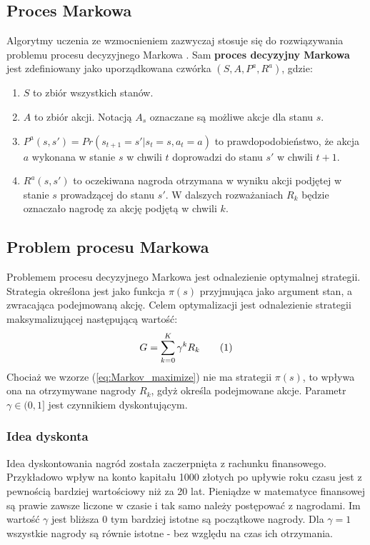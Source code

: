 \documentclass[12pt]{book}
\theoremstyle{plain}
\newcommand\addtag{\refstepcounter{equation}
\renewcommand{\labelenumii}{\theenumii}
\renewcommand{\theenumii}{\theenumi.\arabic{enumii}.}
\tag{\theequation}}
\newcommand{\myref}[1]{(\ref{#1})}
\begin{document}
\subsection*{Proces Markowa}
Algorytmy uczenia ze wzmocnieniem zazwyczaj stosuje się do rozwiązywania problemu procesu decyzyjnego Markowa \cite{reinforcementBook}. Sam \textbf{proces decyzyjny Markowa} jest zdefiniowany jako uporządkowana czwórka $(S,A,P^a,R^a)$, gdzie:
\begin{enumerate}
	\item $S$ to zbiór wszystkich stanów.
	\item $A$ to zbiór akcji. Notacją $A_s$ oznaczane są możliwe akcje dla stanu $s$.
	\item $P^a(s,s')=Pr(s_{t+1}=s'|s_t=s,a_t=a)$ to prawdopodobieństwo, że akcja $a$ wykonana w stanie $s$ w chwili $t$ doprowadzi do stanu $s'$ w chwili $t+1$.
	\item $R^a(s,s')$ to oczekiwana nagroda otrzymana w wyniku akcji podjętej w stanie $s$ prowadzącej do stanu $s'$. W dalszych rozważaniach $R_k$ będzie oznaczało nagrodę za akcję podjętą w chwili $k$.
\end{enumerate}
\subsection*{Problem procesu Markowa}
Problemem procesu decyzyjnego Markowa jest odnalezienie optymalnej strategii. Strategia określona jest jako funkcja $\pi(s)$ przyjmująca jako argument stan, a zwracająca podejmowaną akcję. Celem optymalizacji jest odnalezienie strategii maksymalizującej następującą wartość:
\[
G=\sum_{k=0}^{K} \gamma^k R_{k} \addtag \label{eq:Markov_maximize}
\]
Chociaż we wzorze \myref{eq:Markov_maximize} nie ma strategii $\pi(s)$, to wpływa ona na otrzymywane nagrody $R_{k}$, gdyż określa podejmowane akcje. Parametr $\gamma \in (0,1]$ jest czynnikiem dyskontującym. 
\subsubsection*{Idea dyskonta}
Idea dyskontowania nagród została zaczerpnięta z rachunku finansowego. Przykładowo wpływ na konto kapitału 1000 złotych po upływie roku czasu jest z pewnością bardziej wartościowy niż za 20 lat. Pieniądze w matematyce finansowej są prawie zawsze liczone w czasie i tak samo należy postępować z nagrodami. Im wartość $\gamma$ jest bliższa 0 tym bardziej istotne są początkowe nagrody. Dla $\gamma=1$ wszystkie nagrody są równie istotne - bez względu na czas ich otrzymania.\\
\end{document}
